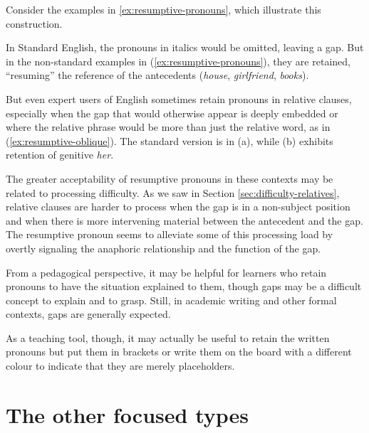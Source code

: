 Consider the examples in \ref{ex:resumptive-pronouns}, which illustrate this construction.
\ea \label{ex:resumptive-pronouns}
    \z
\z

In Standard English, the pronouns in italics would be omitted, leaving a gap. But in the non-standard examples in (\ref{ex:resumptive-pronouns}), they are retained, ``resuming'' the reference of the antecedents (\textit{house}, \textit{girlfriend}, \textit{books}).

But even expert users of English sometimes retain pronouns in relative clauses, especially when the gap that would otherwise appear is deeply embedded or where the relative phrase would be more than just the relative word, as in (\ref{ex:resumptive-oblique}). The standard version is in (a), while (b) exhibits retention of genitive \textit{her}.

\ea \label{ex:resumptive-oblique}
    \z
\z

The greater acceptability of resumptive pronouns in these contexts may be related to processing difficulty. As we saw in Section \ref{sec:difficulty-relatives}, relative clauses are harder to process when the gap is in a non-subject position and when there is more intervening material between the antecedent and the gap. The resumptive pronoun seems to alleviate some of this processing load by overtly signaling the anaphoric relationship and the function of the gap.

From a pedagogical perspective, it may be helpful for learners who retain pronouns to have the situation explained to them, though gaps may be a difficult concept to explain and to grasp. Still, in academic writing and other formal contexts, gaps are generally expected.

As a teaching tool, though, it may actually be useful to retain the written pronouns but put them in brackets or write them on the board with a different colour to indicate that they are merely placeholders.

\section{The other focused types}
